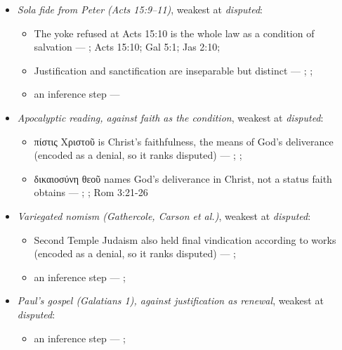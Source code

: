 \documentclass[11pt]{article}
\begin{document}
\begin{itemize}
\begin{itemize}
\item an inference step --- \cite{gathercole-where-boasting-2002}; \cite{carson-variegated-nomism-1-2001}
\end{itemize}
\item \emph{Sola fide from Peter (Acts 15:9–11)}, weakest at \emph{disputed}:
\begin{itemize}
\item The yoke refused at Acts 15:10 is the whole law as a condition of salvation --- \cite[ad loc. Acts 15:10]{bruce-acts-1988}; Acts 15:10; Gal 5:1; Jas 2:10; \cite{das-paul-law-covenant-2001}
\item Justification and sanctification are inseparable but distinct --- \cite[XIII.1]{westminster-confession-1647}; \cite[XI.1]{westminster-confession-1647}; \cite[III.xi.6]{calvin-institutes-1960}
\item an inference step --- \cite[Trent, Session VI (1547), canon 9]{tanner-decrees-1990}
\end{itemize}
\item \emph{Apocalyptic reading, against faith as the condition}, weakest at \emph{disputed}:
\begin{itemize}
\item πίστις Χριστοῦ is Christ's faithfulness, the means of God's deliverance (encoded as a denial, so it ranks disputed) --- \cite{campbell-deliverance-god-2009}; \cite[ad loc. Gal 2:16]{martyn-galatians-1997}; \cite{hays-faith-jesus-christ-2002}
\item δικαιοσύνη θεοῦ names God's deliverance in Christ, not a status faith obtains --- \cite{campbell-deliverance-god-2009}; \cite{martyn-galatians-1997}; Rom 3:21-26
\end{itemize}
\item \emph{Variegated nomism (Gathercole, Carson et al.)}, weakest at \emph{disputed}:
\begin{itemize}
\item Second Temple Judaism also held final vindication according to works (encoded as a denial, so it ranks disputed) --- \cite{gathercole-where-boasting-2002}; \cite{carson-variegated-nomism-1-2001}
\item an inference step --- \cite{gathercole-where-boasting-2002}; \cite{carson-variegated-nomism-1-2001}
\end{itemize}
\item \emph{Paul's gospel (Galatians 1), against justification as renewal}, weakest at \emph{disputed}:
\begin{itemize}
\item an inference step --- \cite[ad loc. Gal 1:6]{moo-galatians-2013}; \cite[XI.1]{westminster-confession-1647}

\end{itemize}
\end{itemize}
\end{document}
